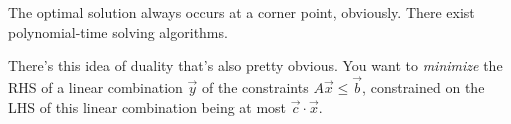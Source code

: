 The optimal solution always occurs at a corner point, obviously.  There exist polynomial-time solving algorithms.

There's this idea of duality that's also pretty obvious.  You want to \emph{minimize} the RHS of a linear combination $\vec{y}$ of the constraints $A \vec{x} \leq \vec{b}$, constrained on the LHS of this linear combination being at most $\vec{c} \cdot \vec{x}$.

